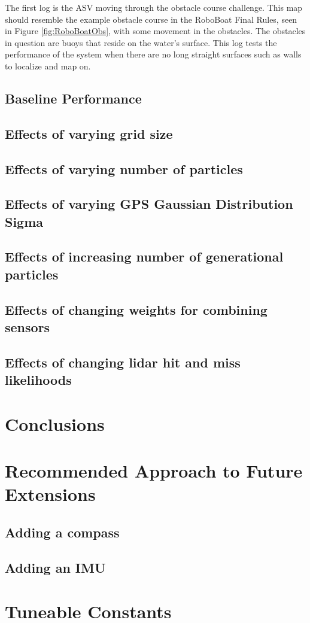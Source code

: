 \documentclass[10pt]{IEEEtran}
\begin{document}
The first log is the ASV moving through the obstacle course challenge.  This map 
should resemble the example obstacle course in the RoboBoat Final Rules, seen in 
Figure \ref{fig:RoboBoatObs}, with some movement
in the obstacles.  The obstacles in question are buoys that reside on the water's surface.
This log tests the performance of the system when there are no long straight surfaces such
as walls to localize and map on.

\subsection{Baseline Performance}

\subsection{Effects of varying grid size}
\subsection{Effects of varying number of particles}
\subsection{Effects of varying GPS Gaussian Distribution Sigma}
\subsection{Effects of increasing number of generational particles}
\subsection{Effects of changing weights for combining sensors}
\subsection{Effects of changing lidar hit and miss likelihoods}


\section{Conclusions}

\section{Recommended Approach to Future Extensions}
\subsection{Adding a compass}
\subsection{Adding an IMU}

\appendix
\section{Tuneable Constants}



\end{document}
